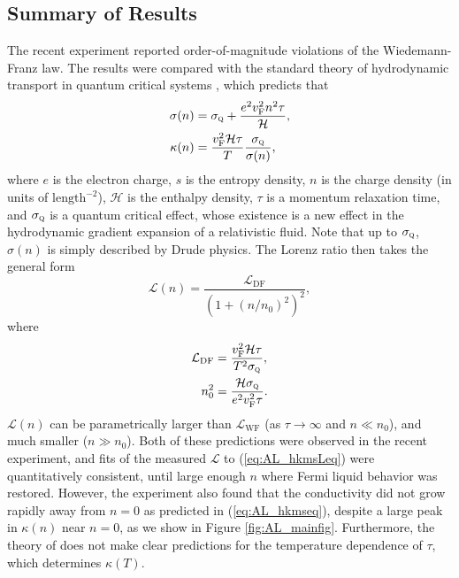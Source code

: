 \subsection{Summary of Results}
The recent experiment \cite{crossno_observation_2016} reported order-of-magnitude violations of the Wiedemann-Franz law.   The results were compared with the standard theory of hydrodynamic transport in quantum critical systems \cite{hartnoll_theory_2007}, which predicts that \begin{subequations}\label{eq:AL_hkmseq}\begin{align}
\sigma(n) &= \sigma_{\textsc{q}} + \frac{e^2v_{\mathrm{F}}^2n^2\tau}{\mathcal{H}}, \\
\kappa(n) &= \frac{v_{\mathrm{F}}^2\mathcal{H}\tau}{T}  \frac{\sigma_{\textsc{q}}}{\sigma(n)},
\end{align}\end{subequations}
where $e$ is the electron charge, $s$ is the entropy density, $n$ is the charge density (in units of $\mathrm{length}^{-2}$),  $\mathcal{H}$ is the enthalpy
 density,  $\tau$ is a momentum relaxation time, and $\sigma_{\textsc{q}}$ is a quantum critical effect,  whose existence is a new effect in the hydrodynamic gradient expansion of a relativistic fluid.   Note that up to $\sigma_{\textsc{q}}$,  $\sigma(n)$ is simply described by Drude physics.  The Lorenz ratio then takes the general form \begin{equation}
\mathcal{L}(n) = \frac{\mathcal{L}_{\mathrm{DF}}}{(1+(n/n_0)^2)^2},  \label{eq:AL_hkmsLeq}
\end{equation}
where
\begin{subequations}\begin{align}
\mathcal{L}_{\mathrm{DF}} &= \frac{v_{\mathrm{F}}^2\mathcal{H}\tau}{T^2\sigma_{\textsc{q}}}, \\
n_0^2 &= \frac{\mathcal{H} \sigma_{\textsc{q}}}{e^2 v_{\mathrm{F}}^2 \tau}.
\end{align}\end{subequations}
$\mathcal{L}(n)$ can be parametrically larger than $\mathcal{L}_{\mathrm{WF}}$ (as $\tau\rightarrow\infty$ and $n\ll n_0$),  and much smaller ($n\gg n_0$).    Both of these predictions were observed in the recent experiment,  and fits of the measured $\mathcal{L}$ to (\ref{eq:AL_hkmsLeq}) were quantitatively consistent,  until large enough $n$ where Fermi liquid behavior was restored.    However, the experiment also found that the conductivity did not grow rapidly away from $n=0$ as predicted in (\ref{eq:AL_hkmseq}), despite a large peak in $\kappa(n)$ near $n=0$,  as we show in Figure \ref{fig:AL_mainfig}.   Furthermore, the theory of \cite{hartnoll_theory_2007} does not make clear predictions for the temperature dependence of $\tau$, which determines $\kappa(T)$.


